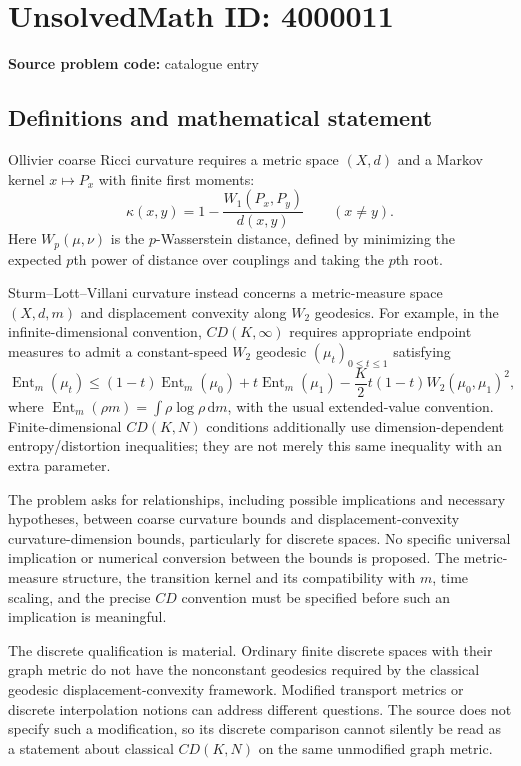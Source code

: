 \documentclass[11pt]{article}
\begin{document}
\section*{UnsolvedMath ID: 4000011}
\textbf{Source problem code:} catalogue entry
\subsection{Definitions and mathematical statement}
Ollivier coarse Ricci curvature requires a metric space $(X,d)$ and a Markov kernel $x\mapsto P_x$ with finite first moments:
\[
\kappa(x,y)=1-\frac{W_1(P_x,P_y)}{d(x,y)}\qquad(x\ne y).
\]
Here $W_p(\mu,\nu)$ is the $p$-Wasserstein distance, defined by minimizing the expected $p$th power of distance over couplings and taking the $p$th root.

Sturm--Lott--Villani curvature instead concerns a metric-measure space $(X,d,m)$ and displacement convexity along $W_2$ geodesics. For example, in the infinite-dimensional convention, $CD(K,\infty)$ requires appropriate endpoint measures to admit a constant-speed $W_2$ geodesic $(\mu_t)_{0\leq t\leq1}$ satisfying
\[
\operatorname{Ent}_m(\mu_t)\leq(1-t)\operatorname{Ent}_m(\mu_0)
+t\operatorname{Ent}_m(\mu_1)-\frac K2t(1-t)W_2(\mu_0,\mu_1)^2,
\]
where $\operatorname{Ent}_m(\rho m)=\int\rho\log\rho\,\mathrm{d}m$, with the usual extended-value convention. Finite-dimensional $CD(K,N)$ conditions additionally use dimension-dependent entropy/distortion inequalities; they are not merely this same inequality with an extra parameter.

The problem asks for relationships, including possible implications and necessary hypotheses, between coarse curvature bounds and displacement-convexity curvature-dimension bounds, particularly for discrete spaces. No specific universal implication or numerical conversion between the bounds is proposed. The metric-measure structure, the transition kernel and its compatibility with $m$, time scaling, and the precise $CD$ convention must be specified before such an implication is meaningful.

The discrete qualification is material. Ordinary finite discrete spaces with their graph metric do not have the nonconstant geodesics required by the classical geodesic displacement-convexity framework. Modified transport metrics or discrete interpolation notions can address different questions. The source does not specify such a modification, so its discrete comparison cannot silently be read as a statement about classical $CD(K,N)$ on the same unmodified graph metric.
\end{document}
